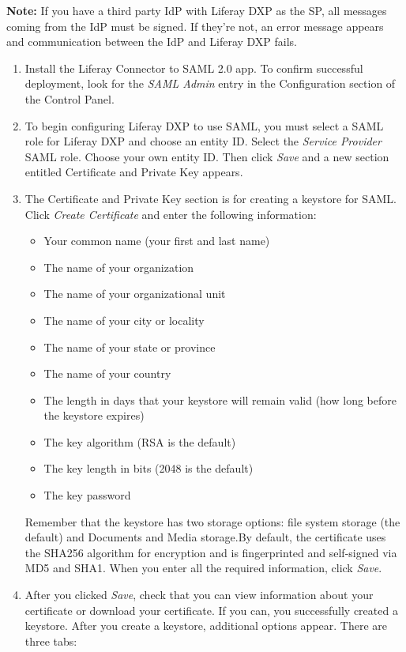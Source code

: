 \noindent\hrulefill

\textbf{Note:} If you have a third party IdP with Liferay DXP as the SP,
all messages coming from the IdP must be signed. If they're not, an
error message appears and communication between the IdP and Liferay DXP
fails.

\noindent\hrulefill

\begin{enumerate}
\def\labelenumi{\arabic{enumi}.}
\item
  Install the Liferay Connector to SAML 2.0 app. To confirm successful
  deployment, look for the \emph{SAML Admin} entry in the Configuration
  section of the Control Panel.
\item
  To begin configuring Liferay DXP to use SAML, you must select a SAML
  role for Liferay DXP and choose an entity ID. Select the \emph{Service
  Provider} SAML role. Choose your own entity ID. Then click \emph{Save}
  and a new section entitled Certificate and Private Key appears.
\item
  The Certificate and Private Key section is for creating a keystore for
  SAML. Click \emph{Create Certificate} and enter the following
  information:

  \begin{itemize}
  \tightlist
  \item
    Your common name (your first and last name)
  \item
    The name of your organization
  \item
    The name of your organizational unit
  \item
    The name of your city or locality
  \item
    The name of your state or province
  \item
    The name of your country
  \item
    The length in days that your keystore will remain valid (how long
    before the keystore expires)
  \item
    The key algorithm (RSA is the default)
  \item
    The key length in bits (2048 is the default)
  \item
    The key password
  \end{itemize}

  Remember that the keystore has two storage options: file system
  storage (the default) and Documents and Media storage.By default, the
  certificate uses the SHA256 algorithm for encryption and is
  fingerprinted and self-signed via MD5 and SHA1. When you enter all the
  required information, click \emph{Save}.
\item
  After you clicked \emph{Save}, check that you can view information
  about your certificate or download your certificate. If you can, you
  successfully created a keystore. After you create a keystore,
  additional options appear. There are three tabs:


\end{enumerate}
